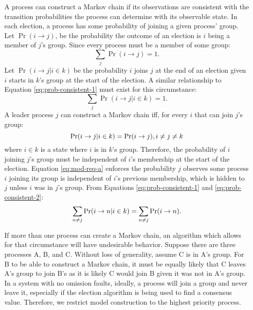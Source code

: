 A process can construct a Markov chain if its observations are consistent with the transition probabilities the process can determine with its observable state.
In each election, a process has some probability of joining a given process' group.
Let $\Pr(i \rightarrow j)$, be the probability the outcome of an election is $i$ being a member of $j$'s group.
Since every process must be a member of some group:
\begin{equation}
\sum_{j} \Pr(i \rightarrow j) = 1.
\label{eq:prob-consistent-1}
\end{equation}
Let $\Pr(i \rightarrow j | i \in k)$ be the probability $i$ joins $j$ at the end of an election given $i$ starts in $k$'s group at the start of the election.
A similar relationship to Equation \ref{eq:prob-consistent-1} must exist for this circumstance:
\begin{equation}
\sum_{j} \Pr(i \rightarrow j | i \in k) = 1.
\label{eq:prob-consistent-2}
\end{equation}
A leader process $j$ can construct a Markov chain iff, for every $i$ that can join $j$'s group:
\vspace{20pt}
\begin{equation}
\Pr(i \rightarrow j | i \in k) = \Pr(i \rightarrow j), i \neq j \neq k
\label{eq:mod-req-a}
\vspace{12pt}
\end{equation}
where $i \in k$ is a state where $i$ is in $k$'s group.
Therefore, the probability of $i$ joining $j$'s group must be independent of $i$'s membership at the start of the election.
Equation \ref{eq:mod-req-a} enforces the probability $j$ observes some process $i$ joining its group is independent of $i$'s previous membership, which is hidden to $j$ unless $i$ was in $j$'s group.
From Equations \ref{eq:prob-consistent-1} and \ref{eq:prob-consistent-2}:
\begin{equation}
\sum_{n \neq j} \Pr(i \rightarrow n | i \in k) = \sum_{n\neq j} \Pr(i \rightarrow n).
\label{eq:mod-req-b}
\vspace{12pt}
\end{equation}

If more than one process can create a Markov chain, an algorithm which allows for that circumstance will have undesirable behavior.
Suppose there are three processes A, B, and C.
Without loss of generality, assume C is in A's group.
For B to be able to construct a Markov chain, it must be equally likely that C leaves A's group to join B's as it is likely C would join B given it was not in A's group.
In a system with no omission faults, ideally, a process will join a group and never leave it, especially if the election algorithm is being used to find a consensus value.
Therefore, we restrict model construction to the highest priority process.

